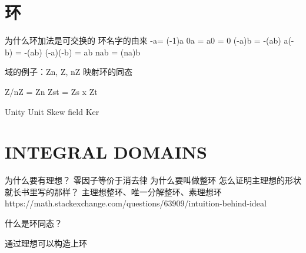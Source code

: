 \chapter{环}
为什么环加法是可交换的
环名字的由来
-a= (-1)a
0a = a0 = 0
(-a)b = -(ab)
a(-b) = -(ab)
(-a)(-b) = ab
nab = (na)b

域的例子：Zn, Z, nZ
映射环的同态

Z/nZ = Zn
Zst = Zs x Zt

Unity Unit Skew field Ker

\chapter{INTEGRAL DOMAINS}

为什么要有理想？
零因子等价于消去律
为什么要叫做整环
怎么证明主理想的形状就长书里写的那样？
主理想整环、唯一分解整环、素理想环
https://math.stackexchange.com/questions/63909/intuition-behind-ideal

什么是环同态？

通过理想可以构造上环
